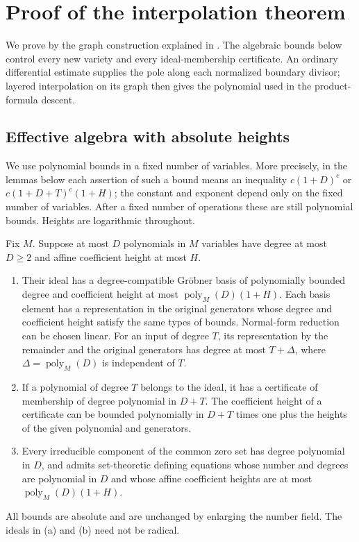 \section{Proof of the interpolation theorem}\label{int:proof}

We prove  by the graph construction explained in
.  The algebraic bounds below control every new
variety and every ideal-membership certificate.  An ordinary differential
estimate supplies the pole along each normalized boundary divisor;
layered interpolation on its graph then gives the polynomial used in
the product-formula descent.

\subsection{Effective algebra with absolute heights}

We use polynomial bounds in a fixed number of variables.  More precisely,
in the lemmas below each assertion of such a bound means an inequality
$c(1+D)^c$ or $c(1+D+T)^c(1+H)$; the constant and exponent depend only
on the fixed number of variables.  After a fixed number of operations these
are still polynomial bounds.  Heights are logarithmic throughout.

\begin{lemma}\label{int:algebra}
Fix $M$.  Suppose at most $D$ polynomials in $M$ variables have degree at
most $D\geq2$ and affine coefficient height at most $H$.
\begin{enumerate}[label=\textup{(\alph*)}]
\item Their ideal has a degree-compatible Gr\"obner basis of polynomially
bounded degree and coefficient height at most
$\operatorname{poly}_M(D)(1+H)$.  Each basis element has a representation
in the original generators whose degree and coefficient height satisfy
the same types of bounds.  Normal-form reduction can be chosen linear.
For an input of degree $T$, its representation by the remainder and the
original generators has degree at most $T+\Delta$, where
$\Delta=\operatorname{poly}_M(D)$ is independent of $T$.
\item If a polynomial of degree $T$ belongs to the ideal, it has a
certificate of membership of degree polynomial in $D+T$.  The coefficient
height of a certificate can be bounded polynomially in $D+T$ times one
plus the heights of the given polynomial and generators.
\item Every irreducible component of the common zero set has degree
polynomial in $D$, and admits set-theoretic defining equations whose number
and degrees are polynomial in $D$ and whose affine coefficient heights
are at most $\operatorname{poly}_M(D)(1+H)$.
\end{enumerate}
All bounds are absolute and are unchanged by enlarging the number field.
The ideals in \textup{(a)} and \textup{(b)} need not be radical.
\end{lemma}

